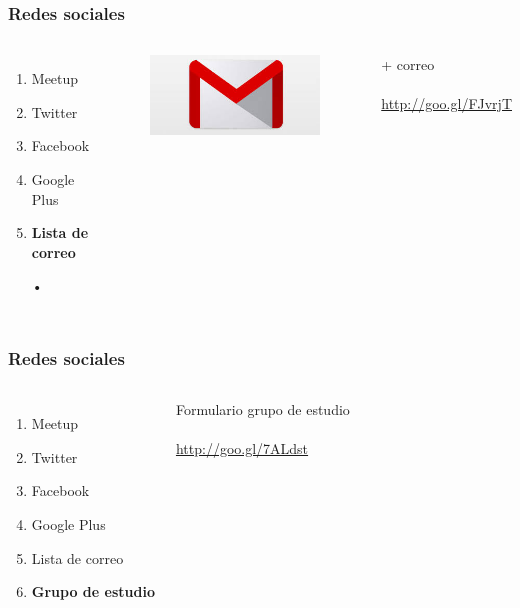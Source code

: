 \documentclass{beamer}
\begin{document}
\begin{frame}
\frametitle{Redes sociales}
\begin{columns}[c] %

\begin{enumerate}
\item Meetup
\item Twitter
\item Facebook
\item Google Plus
\item \textbf{Lista de correo}
\item[•]	
\end{enumerate}

\begin{figure}
\includegraphics[width=0.5\linewidth]{gmail.png}
\end{figure}
{\color{blue}+ correo}
\\~\\
{\color{blue}\url{http://goo.gl/FJvrjT}}
\end{columns}
\end{frame}
\begin{frame}
\frametitle{Redes sociales}
\begin{columns}[c] %

\begin{enumerate}
\item Meetup
\item Twitter
\item Facebook
\item Google Plus
\item Lista de correo
\item \textbf{Grupo de estudio}
\end{enumerate}

{\color{blue}Formulario grupo de estudio}
\\~\\
{\color{blue}\url{http://goo.gl/7ALdst}}
\end{columns}
\end{frame}
\end{document}
